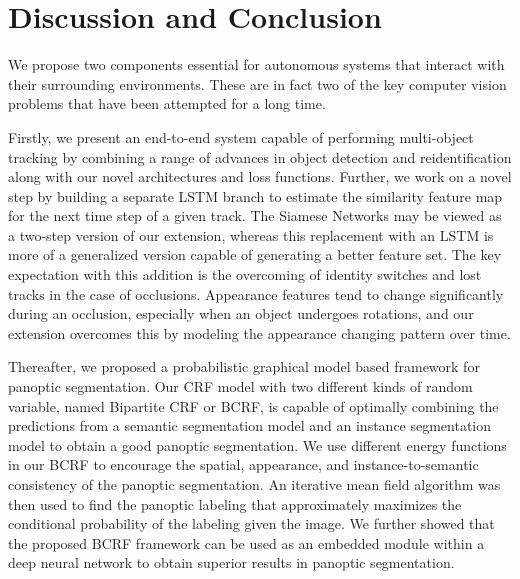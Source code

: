 \chapter{Discussion and Conclusion}

We propose two components essential for autonomous systems that interact with their surrounding environments. These are in fact two of the key computer vision problems that have been attempted for a long time. 

Firstly, we present an end-to-end system capable of performing multi-object tracking by combining a range of advances in object detection and reidentification along with our novel architectures and loss functions. Further, we work on a novel step by building a separate LSTM branch to estimate the similarity feature map for the next time step of a given track. The Siamese Networks may be viewed as a two-step version of our extension, whereas this replacement with an LSTM is more of a generalized version capable of generating a better feature set. The key expectation with this addition is the overcoming of identity switches and lost tracks in the case of occlusions. Appearance features tend to change significantly during an occlusion, especially when an object undergoes rotations, and our extension overcomes this by modeling the appearance changing pattern over time. 

Thereafter, we proposed a probabilistic graphical model based framework for panoptic segmentation. Our CRF model with two different kinds of random variable, named Bipartite CRF or BCRF, is capable of optimally combining the predictions from a semantic segmentation model and an instance segmentation model to obtain a good panoptic segmentation. We use different energy functions in our BCRF to encourage the spatial, appearance, and instance-to-semantic consistency of the panoptic segmentation. An iterative mean field algorithm was then used to find the panoptic labeling that approximately maximizes the conditional probability of the labeling given the image. We further showed that the proposed BCRF framework can be used as an embedded module within a deep neural network to obtain superior results in panoptic segmentation.


